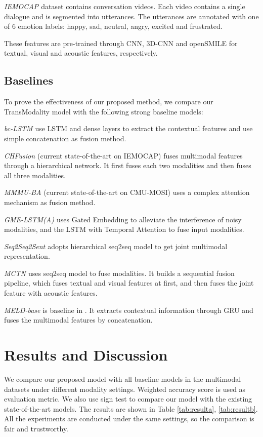 \documentclass[sigconf]{acmart}
\begin{document}
	\textit{IEMOCAP \cite{busso2008iemocap}} dataset contains conversation videos. Each video contains a single dialogue and is segmented into utterances. The utterances are annotated with one of 6 emotion labels: happy, sad, neutral, angry, excited and frustrated. 
	
	These features are pre-trained through CNN, 3D-CNN and openSMILE \cite{eyben2010opensmile} for textual, visual and acoustic features, respectively.

	\subsection{Baselines}
	To prove the effectiveness of our proposed method, we compare our TransModality model with the following strong baseline models: 
	
	\textit{bc-LSTM \cite{poria2017context}} use LSTM and dense layers to extract the contextual features and use simple concatenation as fusion method.

	\textit{CHFusion \cite{majumder2018multimodal}} (current state-of-the-art on IEMOCAP) fuses multimodal features through a hierarchical network. It first fuses each two modalities and then fuses all three modalities.

	\textit{MMMU-BA \cite{ghosal2018contextual}} (current state-of-the-art on CMU-MOSI) uses a complex attention mechanism as fusion method.

	\textit{GME-LSTM(A) \cite{chen2017multimodal}} uses Gated Embedding to alleviate the interference of noisy modalities, and the LSTM with Temporal Attention to fuse input modalities.

	\textit{Seq2Seq2Sent \cite{pham2018seq2seq2sentiment}} adopts hierarchical seq2seq model to get joint multimodal representation.

	\textit{MCTN \cite{pham2018found}} uses seq2seq model to fuse modalities. It builds a sequential fusion pipeline, which fuses textual and visual features at first, and then fuses the joint feature with acoustic features. 

	\textit{MELD-base \cite{poria2018meld}} is baseline in \citet{poria2018meld}. It extracts contextual information through GRU and fuses the multimodal features by concatenation.

	\section{Results and Discussion}
	We compare our proposed model with all baseline models in the multimodal datasets under different modality settings. Weighted accuracy score is used as evaluation metric. We also use sign test \cite{dixon1946statistical} to compare our model with the existing state-of-the-art models. The results are shown in Table \ref{tab:resulta}, \ref{tab:resultb}. All the experiments are conducted under the same settings, so the comparison is fair and trustworthy.
\end{document}
